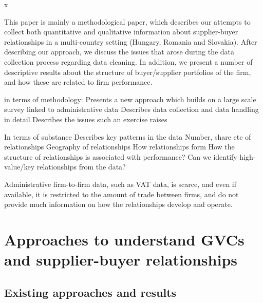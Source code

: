x\documentclass[final, dvipsnames, authoryear,12pt]{elsarticle}
\begin{document}
This paper is mainly a methodological paper, which describes our attempts to collect both quantitative and qualitative information about supplier-buyer relationships in a multi-country setting (Hungary, Romania and Slovakia). After describing our approach, we discuss the issues that arose during the data collection process regarding data cleaning. In addition, we present a number of descriptive results about the structure of buyer/supplier portfolios of the firm, and how these are related to firm performance.

in terms of methodology: 
Presents a new approach which builds on a large scale survey linked to administrative data
Describes data collection and data handling in detail
Describes the issues such an exercise raises

In terms of substance
Describes key patterns in the data
Number, share etc of relationships
Geography of relationships
How relationships form
How the structure of relationships is associated with performance?
Can we identify high-value/key relationships from the data?



Administrative firm-to-firm data, such as VAT data, is scarce, and even if available, it is restricted to the amount of trade between firms, and do not provide much information on how the relationships develop and operate.

\section{Approaches to understand GVCs and supplier-buyer relationships} 
\label{sec: approach}

\subsection{Existing approaches and results}

\end{document}
